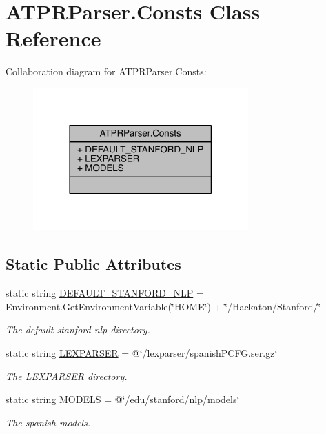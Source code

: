 \hypertarget{class_a_t_p_r_parser_1_1_consts}{}\section{A\+T\+P\+R\+Parser.\+Consts Class Reference}
\label{class_a_t_p_r_parser_1_1_consts}


Collaboration diagram for A\+T\+P\+R\+Parser.\+Consts\+:
\nopagebreak
\begin{figure}[H]
\begin{center}
\leavevmode
\includegraphics[width=234pt]{db/d18/class_a_t_p_r_parser_1_1_consts__coll__graph}
\end{center}
\end{figure}
\subsection*{Static Public Attributes}
\begin{DoxyCompactItemize}
\item 
static string \hyperlink{class_a_t_p_r_parser_1_1_consts_a2a255a7847f7123ddac4b35f829f8ad5}{D\+E\+F\+A\+U\+L\+T\+\_\+\+S\+T\+A\+N\+F\+O\+R\+D\+\_\+\+N\+LP} = Environment.\+Get\+Environment\+Variable(\char`\"{}H\+O\+ME\char`\"{}) + \char`\"{}/Hackaton/Stanford/\char`\"{}
\begin{DoxyCompactList}\small\item\em The default stanford nlp directory. \end{DoxyCompactList}\item 
static string \hyperlink{class_a_t_p_r_parser_1_1_consts_ab61b6ffd61033d649b5eed2c68fd253c}{L\+E\+X\+P\+A\+R\+S\+ER} = @\char`\"{}/lexparser/spanish\+P\+C\+F\+G.\+ser.\+gz\char`\"{}
\begin{DoxyCompactList}\small\item\em The L\+E\+X\+P\+A\+R\+S\+ER directory. \end{DoxyCompactList}\item 
static string \hyperlink{class_a_t_p_r_parser_1_1_consts_af9e34e76e089c4884245fd4a79c09e2c}{M\+O\+D\+E\+LS} = @\char`\"{}/edu/stanford/nlp/models\char`\"{}
\begin{DoxyCompactList}\small\item\em The spanish models. \end{DoxyCompactList}\end{DoxyCompactItemize}


